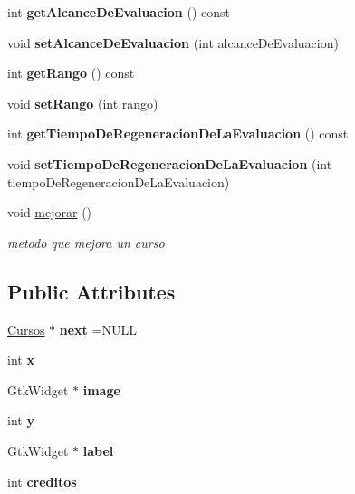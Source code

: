 \begin{DoxyCompactItemize}
int {\bfseries get\+Alcance\+De\+Evaluacion} () const
\item 
\mbox{\label{classCursos_a2bbe568c20a5425dfb7bf5c12b8ba525}} 
void {\bfseries set\+Alcance\+De\+Evaluacion} (int alcance\+De\+Evaluacion)
\item 
\mbox{\label{classCursos_a7c7ef6ac46d21a71f275a8435430c214}} 
int {\bfseries get\+Rango} () const
\item 
\mbox{\label{classCursos_af18a642b755d3656836896736a1a18e7}} 
void {\bfseries set\+Rango} (int rango)
\item 
\mbox{\label{classCursos_a61c57f95788734ddebca25e8471ce5cf}} 
int {\bfseries get\+Tiempo\+De\+Regeneracion\+De\+La\+Evaluacion} () const
\item 
\mbox{\label{classCursos_a5983a71c97b00b5c390d9e4b7a627378}} 
void {\bfseries set\+Tiempo\+De\+Regeneracion\+De\+La\+Evaluacion} (int tiempo\+De\+Regeneracion\+De\+La\+Evaluacion)
\item 
\mbox{\label{classCursos_a083344f6d052a73376a4534b58a9819e}} 
void \hyperlink{classCursos_a083344f6d052a73376a4534b58a9819e}{mejorar} ()
\begin{DoxyCompactList}\small\item\em metodo que mejora un curso \end{DoxyCompactList}\end{DoxyCompactItemize}
\subsection*{Public Attributes}
\begin{DoxyCompactItemize}
\item 
\mbox{\label{classCursos_ac77a50209b65154fc90f3be93da71964}} 
\hyperlink{classCursos}{Cursos} $\ast$ {\bfseries next} =N\+U\+LL
\item 
\mbox{\label{classCursos_abb45f4b79721ac490f688c14a61ca567}} 
int {\bfseries x}
\item 
\mbox{\label{classCursos_a39e93e345c512dd318ff2ddca05c4c1d}} 
Gtk\+Widget $\ast$ {\bfseries image}
\item 
\mbox{\label{classCursos_a324cbe41e23bae2e5486803d049d6d11}} 
int {\bfseries y}
\item 
\mbox{\label{classCursos_a3e2896879b7e09f6ac496879bae06dc8}} 
Gtk\+Widget $\ast$ {\bfseries label}
\item 
\mbox{\label{classCursos_afa07efa13762b5f75ba11aadaee6dcf5}} 
int {\bfseries creditos}
\end{DoxyCompactItemize}


